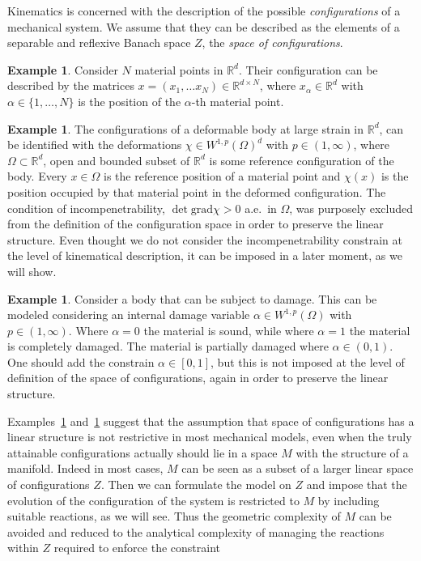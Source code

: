\documentclass[a4paper,10pt,oneside]{amsbook}
\numberwithin{section}{chapter}
\numberwithin{equation}{chapter}
\theoremstyle{definition}
\newtheorem{ex}[prop]{Example}
\begin{document}
Kinematics is concerned with the description of the possible \emph{configurations} of a mechanical system. We assume that they can be described as the elements of a separable and reflexive Banach space $Z$, the \emph{space of configurations}.
\begin{ex}
\label{ex:modeling:particles}
Consider $N$ material points in $\mathbb{R}^d$. Their configuration can be described by the matrices $x=(x_1,\dots x_N)\in\mathbb{R}^{d\times N}$, where $x_{\alpha}\in\mathbb{R}^d$ with $\alpha\in\{1,\dots,N\}$ is the position of the $\alpha$-th material point.
\end{ex}
\begin{ex}
\label{ex:modeling:large-strain}
The configurations of a deformable body at large strain in $\mathbb{R}^d$, can be identified with the deformations $\chi\in W^{1,p}(\Omega)^d$ with $p\in(1,\infty)$, where $\Omega\subset\mathbb{R}^d$, open and bounded subset of $\mathbb{R}^d$ is some reference configuration of the body. Every $x\in\Omega$ is the reference position of a material point and $\chi(x)$ is the position occupied by that material point in the deformed configuration. The condition of incompenetrability, $\det\text{grad}\chi>0$ a.e.\ in $\Omega$, was purposely excluded from the definition of the configuration space in order to preserve the linear structure. Even thought we do not consider the incompenetrability constrain at the level of kinematical description, it can be imposed in a later moment, as we will show.
\end{ex}
\begin{ex}
\label{ex:modeling:micro}
Consider a body that can be subject to damage. This can be modeled considering an internal damage variable $\alpha\in W^{1,p}(\Omega)$ with $p\in(1,\infty)$. Where $\alpha=0$ the material is sound, while where $\alpha=1$ the material is completely damaged. The material is partially damaged where $\alpha\in(0,1)$. One should add the constrain $\alpha\in[0,1]$, but this is not imposed at the level of definition of the space of configurations, again in order to preserve the linear structure.
\end{ex}
Examples~\ref{ex:modeling:large-strain} and~\ref{ex:modeling:micro} suggest that the assumption that space of configurations has a linear structure is not restrictive in most mechanical models, even when the truly attainable configurations actually should lie in a space $M$ with the structure of a manifold. Indeed in most cases, $M$ can be seen as a subset of a larger linear space of configurations $Z$. Then we can formulate the model on $Z$ and impose that the evolution of the configuration of the system is restricted to $M$ by including suitable reactions, as we will see. Thus the geometric complexity of $M$ can be avoided and reduced to the analytical complexity of managing the reactions within $Z$ required to enforce the constraint
\end{document}
